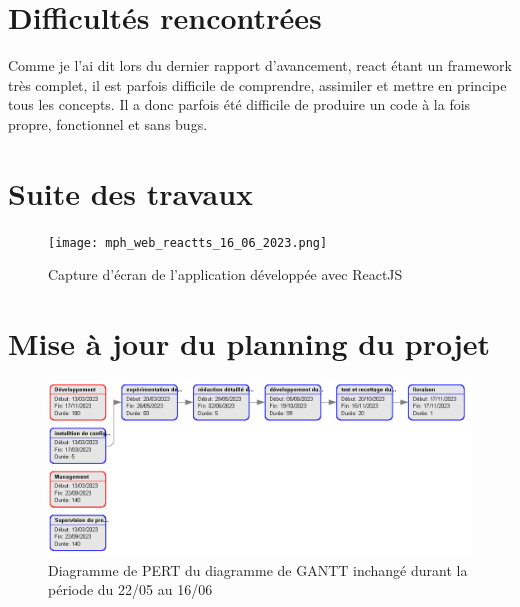\documentclass[a4paper, 12pt, french]{article}
\begin{document}
	\section{Difficultés rencontrées}
		Comme je l'ai dit lors du dernier rapport d'avancement, react étant un framework très complet, il est parfois difficile de comprendre, assimiler et mettre en principe tous les concepts. Il a donc parfois été difficile de produire un code à la fois propre, fonctionnel et sans bugs.	

	\newpage
	
	\section{Suite des travaux}
		\begin{figure}[h!]
			\texttt{[image: mph\_web\_reactts\_16\_06\_2023.png]}
			\caption{Capture d'écran de l'application développée avec ReactJS}
		\end{figure}

	\section{Mise à jour du planning du projet}
		\begin{figure}[h!]
			\includegraphics[width=\linewidth]{gantt_13_04_13_05.png}
			\caption{Diagramme de PERT du diagramme de GANTT inchangé durant la période du 22/05 au 16/06}
		\end{figure}
		
		
\end{document}
